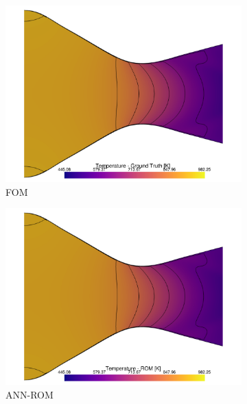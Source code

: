 \documentclass[tg, EN]{ufabcFHZh_tg}
\begin{document}
\begin{figure}[H]
    \centering
    \begin{subfigure}[b]{0.32\textwidth}
        \centering
        \includegraphics[width=\textwidth]{Figuras/nn_ground_truth_temperature.pdf}
        \caption{FOM}
    \end{subfigure}
    \hfill
    \begin{subfigure}[b]{0.32\textwidth}
        \centering
        \includegraphics[width=\textwidth]{Figuras/nn_prediction_temperature.pdf}
        \caption{ANN-ROM}
    \end{subfigure}
    \hfill
    \begin{subfigure}[b]{0.32\textwidth}
        \centering

\end{subfigure}
\end{figure}
\end{document}
